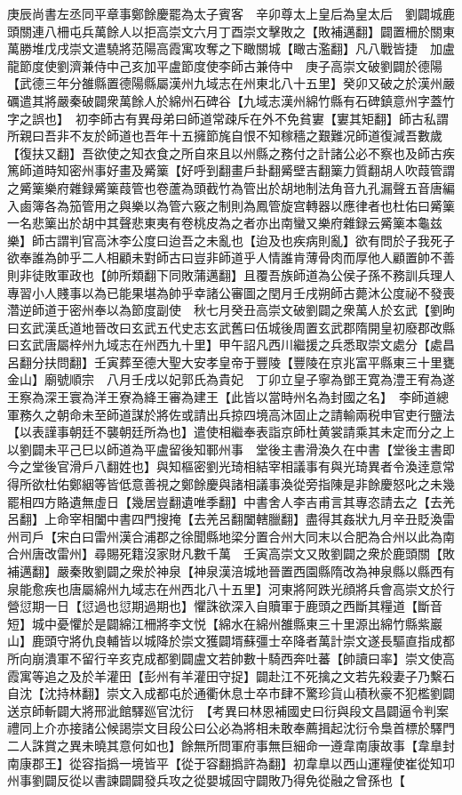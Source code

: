 庚辰尚書左丞同平章事鄭餘慶罷為太子賓客　辛卯尊太上皇后為皇太后　劉闢城鹿頭關連八柵屯兵萬餘人以拒高崇文六月丁酉崇文擊敗之【敗補邁翻】闢置柵於關東萬勝堆戊戌崇文遣驍將范陽高霞寓攻奪之下瞰關城【瞰古濫翻】凡八戰皆捷　加盧龍節度使劉濟兼侍中己亥加平盧節度使李師古兼侍中　庚子高崇文破劉闢於德陽【武德三年分雒縣置德陽縣屬漢州九域志在州東北八十五里】癸卯又破之於漢州嚴礪遣其將嚴秦破闢衆萬餘人於綿州石碑谷【九域志漢州綿竹縣有石碑鎮意州字蓋竹字之誤也】　初李師古有異母弟曰師道常疎斥在外不免貧寠【寠其矩翻】師古私謂所親曰吾非不友於師道也吾年十五擁節旄自恨不知稼穡之艱難况師道復減吾數歲【復扶又翻】吾欲使之知衣食之所自來且以州縣之務付之計諸公必不察也及師古疾篤師道時知密州事好畫及觱篥【好呼到翻畫戶卦翻觱壁吉翻篥力質翻胡人吹葭管謂之觱篥樂府雜録觱篥葭管也卷蘆為頭截竹為管出於胡地制法角音九孔漏聲五音唐編入鹵簿各為笳管用之與樂以為管六竅之制則為鳳管旋宫轉器以應律者也杜佑曰觱篥一名悲篥出於胡中其聲悲東夷有卷桃皮為之者亦出南蠻又樂府雜録云觱篥本龜兹樂】師古謂判官高沐李公度曰迨吾之未亂也【迨及也疾病則亂】欲有問於子我死子欲奉誰為帥乎二人相顧未對師古曰豈非師道乎人情誰肯薄骨肉而厚他人顧置帥不善則非徒敗軍政也【帥所類翻下同敗蒲邁翻】且覆吾族師道為公侯子孫不務訓兵理人專習小人賤事以為已能果堪為帥乎幸諸公審圖之閏月壬戌朔師古薨沐公度祕不發喪濳逆師道于密州奉以為節度副使　秋七月癸丑高崇文破劉闢之衆萬人於玄武【劉昫曰玄武漢氐道地晉改曰玄武五代史志玄武舊曰伍城後周置玄武郡隋開皇初廢郡改縣曰玄武唐屬梓州九域志在州西九十里】甲午詔凡西川繼援之兵悉取崇文處分【處昌呂翻分扶問翻】壬寅葬至德大聖大安孝皇帝于豐陵【豐陵在京兆富平縣東三十里甕金山】廟號順宗　八月壬戌以妃郭氏為貴妃　丁卯立皇子寧為鄧王寛為澧王宥為遂王察為深王寰為洋王寮為絳王審為建王【此皆以當時州名為封國之名】　李師道總軍務久之朝命未至師道謀於將佐或請出兵掠四境高沐固止之請輸兩税申官吏行鹽法【以表謹事朝廷不襲朝廷所為也】遣使相繼奉表詣京師杜黄裳請乘其未定而分之上以劉闢未平己巳以師道為平盧留後知鄆州事　堂後主書滑渙久在中書【堂後主書即今之堂後官滑戶八翻姓也】與知樞密劉光琦相結宰相議事有與光琦異者令渙逹意常得所欲杜佑鄭絪等皆低意善視之鄭餘慶與諸相議事渙從旁指陳是非餘慶怒叱之未幾罷相四方賂遺無虛日【幾居豈翻遺唯季翻】中書舍人李吉甫言其專恣請去之【去羌呂翻】上命宰相闔中書四門搜掩【去羌呂翻闔轄臘翻】盡得其姦狀九月辛丑貶渙雷州司戶【宋白曰雷州漢合浦郡之徐聞縣地梁分置合州大同末以合肥為合州以此為南合州唐改雷州】尋賜死籍沒家財凡數千萬　壬寅高崇文又敗劉闢之衆於鹿頭關【敗補邁翻】嚴秦敗劉闢之衆於神泉【神泉漢涪城地晉置西園縣隋改為神泉縣以縣西有泉能愈疾也唐屬綿州九域志在州西北八十五里】河東將阿跌光顔將兵會高崇文於行營愆期一日【愆過也愆期過期也】懼誅欲深入自贖軍于鹿頭之西斷其糧道【斷音短】城中憂懼於是闢綿江柵將李文悦【綿水在綿州雒縣東三十里源出綿竹縣紫巖山】鹿頭守將仇良輔皆以城降於崇文獲闢壻蘇彊士卒降者萬計崇文遂長驅直指成都所向崩潰軍不留行辛亥克成都劉闢盧文若帥數十騎西奔吐蕃【帥讀曰率】崇文使高霞寓等追之及於羊灌田【彭州有羊灌田守捉】闢赴江不死擒之文若先殺妻子乃繫石自沈【沈持林翻】崇文入成都屯於通衢休息士卒市肆不驚珍貨山積秋豪不犯檻劉闢送京師斬闢大將邢泚館驛廵官沈衍　【考異曰林恩補國史曰衍與段文昌闢逼令判案禮同上介亦接諸公候謁崇文目段公曰公必為將相未敢奉薦揖起沈衍令梟首標於驛門二人誅賞之異未曉其意何如也】餘無所問軍府事無巨細命一遵韋南康故事【韋臯封南康郡王】從容指撝一境皆平【從于容翻撝許為翻】初韋臯以西山運糧使崔從知卭州事劉闢反從以書諫闢闢發兵攻之從嬰城固守闢敗乃得免從融之曾孫也【